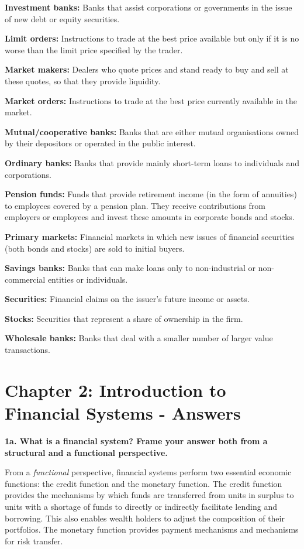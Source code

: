 \documentclass[twoside,openany]{book}
\begin{document}
\textbf{Investment banks:} Banks that assist corporations or governments in the issue of new debt or equity securities.

\textbf{Limit orders:} Instructions to trade at the best price available but only if it is no worse than the limit price specified by the trader.

\textbf{Market makers:} Dealers who quote prices and stand ready to buy and sell at these quotes, so that they provide liquidity.

\textbf{Market orders:} Instructions to trade at the best price currently available in the market.

\textbf{Mutual/cooperative banks:} Banks that are either mutual organisations owned by their depositors or operated in the public interest.

\textbf{Ordinary banks:} Banks that provide mainly short-term loans to individuals and corporations.

\textbf{Pension funds:} Funds that provide retirement income (in the form of annuities) to employees covered by a pension plan. They receive contributions from employers or employees and invest these amounts in corporate bonds and stocks.

\textbf{Primary markets:} Financial markets in which new issues of financial securities (both bonds and stocks) are sold to initial buyers.

\textbf{Savings banks:} Banks that can make loans only to non-industrial or non-commercial entities or individuals.

\textbf{Securities:} Financial claims on the issuer's future income or assets.

\textbf{Stocks:} Securities that represent a share of ownership in the firm.

\textbf{Wholesale banks:} Banks that deal with a smaller number of larger value transactions.

\section*{Chapter 2: Introduction to Financial Systems - Answers}

\textbf{1a. What is a financial system? Frame your answer both from a structural and a functional perspective.}

From a \textit{functional} perspective, financial systems perform two essential economic functions: the credit function and the monetary function. The credit function provides the mechanisms by which funds are transferred from units in surplus to units with a shortage of funds to directly or indirectly facilitate lending and borrowing. This also enables wealth holders to adjust the composition of their portfolios. The monetary function provides payment mechanisms and mechanisms for risk transfer.
\end{document}
